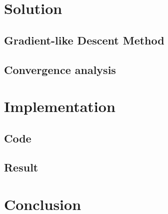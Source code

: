 \documentclass[11pt]{article}
\begin{document}
\section{Solution}

\subsection{Gradient-like Descent Method}

\subsection{Convergence analysis}

\section{Implementation}

\subsection{Code}

\subsection{Result}


\section{Conclusion}




\end{document}
